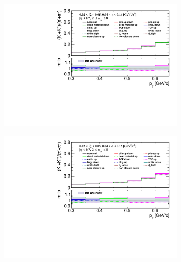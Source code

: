 \begin{figure}[h!]
	\centering
	\begin{subfigure}{.49\textwidth}
		\includegraphics[width=\textwidth,page=1]{chapters/chrgSTAR/img/syst/outPID_Kpi.pdf}
	\end{subfigure}
	\begin{subfigure}{.49\textwidth}
		\includegraphics[width=\textwidth,page=2]{chapters/chrgSTAR/img/syst/outPID_Kpi.pdf}
	\end{subfigure}
	\begin{subfigure}{.49\textwidth}

\end{subfigure}
\end{figure}
